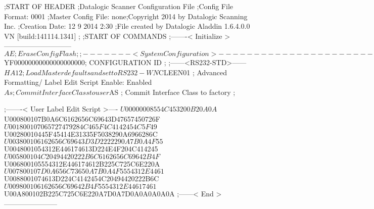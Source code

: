 ;START OF HEADER
;Datalogic Scanner Configuration File
;Config File Format: 0001
;Master Config File: none;Copyright 2014 by Datalogic Scanning Inc.
;Creation Date: 12 9 2014 2:30
;File created by Datalogic Aladdin 1.6.4.0.0 VN [build:141114.1341]
;
;START OF COMMANDS
;-------< Initialize >-----------------------------
$AE                 ; Erase Config Flash
;
;-------< System Configuration >-------------------------------
$YF00000000000000000000; CONFIGURATION ID
;
;------<RS232-STD>------
$HA12               ; Load Master defaults and set to RS232-WN
$CLEEN01            ; Advanced Formatting/ Label Edit Script Enable: Enabled
$As                 ; Commit Interface Class to user
$AS                 ; Commit Interface Class to factory
;

;-------< User Label Edit Script >----
$U00000008554C453200B20A0A
$U000800107B0A6C6162656C69643D47657450726F
$U001800107065727479284C465F4C4142454C5F49
$U00280010445F45414E31335F5038290A6966286C
$U003800106162656C69643D3D2222290A7B0A4F55
$U0048001054312E446174613D224E4F204C414245
$U005800104C20494420222B6C6162656C69642B4F
$U006800105554312E446174612B225C725C6E220A
$U007800107D0A656C73650A7B0A4F5554312E4461
$U0088001074613D224C4142454C20494420222B6C
$U009800106162656C69642B4F5554312E44617461
$U00A800102B225C725C6E220A7D0A7D0A0A0A0A0A
;------< End >-----------------------
